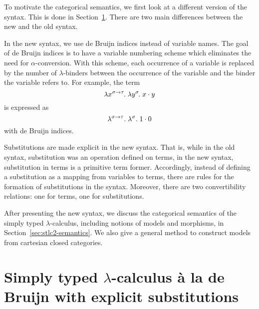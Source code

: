 To motivate the categorical semantics, we first look at a different version of the syntax. This is done in Section~\ref{sec:stlc2-syntax}. There are two main differences between the new and the old syntax.
\begin{items}
    \item In the new syntax, we use de Bruijn indices instead of variable names. The goal of de Bruijn indices is to have a variable numbering scheme which eliminates the need for $\alpha$-conversion. With this scheme, each occurrence of a variable is replaced by the number of $\lambda$-binders between the occurrence of the variable and the binder the variable refers to. For example, the term
    \[ \lambda x^{\sigma \to \tau}\hspace{-1pt}.\;\lambda y^{\sigma}\hspace{-1pt}.\;x \cdot y \]
    is expressed as
    \[ \lambda^{\sigma \to \tau}.\;\lambda^\sigma.\;1 \cdot 0 \]
    with de Bruijn indices.
    \item Substitutions are made explicit in the new syntax. That is, while in the old syntax, substitution was an operation defined on terms, in the new syntax, substitution in terms is a primitive term former. Accordingly, instead of defining a substitution as a mapping from variables to terms, there are rules for the formation of substitutions in the syntax. Moreover, there are two convertibility relations: one for terms, one for substitutions.
\end{items}

After presenting the new syntax, we discuss the categorical semantics of the simply typed $\lambda$-calculus, including notions of models and morphisms, in Section~\ref{sec:stlc2-semantics}. We also give a general method to construct models from cartesian closed categories.

\section{Simply typed \texorpdfstring{$\lambda$}{lambda}-calculus \`a la de Bruijn with explicit substitutions} \label{sec:stlc2-syntax}

\begin{comment}
Key points
\begin{items}
\item syntax (terms, substitutions, equations)
\item normal forms
\item comparison to previous syntax, explain similarities and differences
\end{items}
\end{comment}

